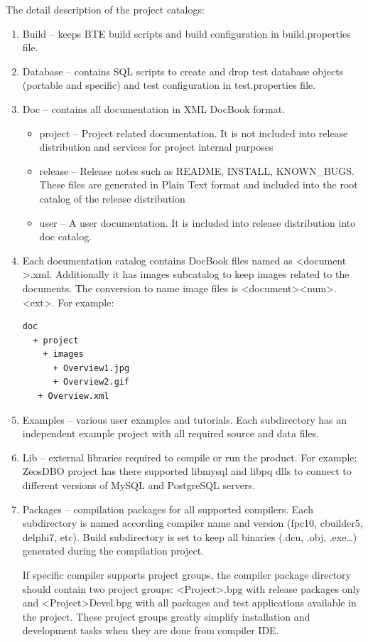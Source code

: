 \documentclass[a4paper,12pt,oneside]{book}
\begin{document}
The detail description of the project catalogs:
\begin{enumerate}
  \item Build – keeps BTE build scripts and build configuration in build.properties file.
	\item Database – contains SQL scripts to create and drop test database objects (portable and specific) and test configuration in test.properties file.
	\item Doc – contains all documentation in XML DocBook format.
	  \begin{itemize}
		  \item project – Project related documentation. It is not included into release distribution and services for project internal purposes
			\item release – Release notes such as README, INSTALL, KNOWN\_BUGS. These files are generated in Plain Text format and included into the root catalog of the release distribution
			\item user – A user documentation. It is included into release distribution into doc catalog.
		\end{itemize}
  \item
    Each documentation catalog contains DocBook files named as \textless document \textgreater .xml.
    Additionally it has images subcatalog to keep images related to the documents.
    The conversion to name image files is \textless document\textgreater\textless num\textgreater.\textless ext\textgreater. For example:
    \begin{verbatim}
doc
  + project
    + images
      + Overview1.jpg
      + Overview2.gif
   + Overview.xml
    \end{verbatim}		
  \item
	  Examples – various user examples and tutorials.
		Each subdirectory has an independent example project with all required source and data files.
	\item
	  Lib – external libraries required to compile or run the product.
		For example: ZeosDBO project has there supported libmysql and libpq dlls to connect to different versions of MySQL and PostgreSQL servers.
  \item
	  Packages – compilation packages for all supported compilers.
		Each subdirectory is named according compiler name and version (fpc10, cbuilder5, delphi7, etc).
		Build subdirectory is set to keep all binaries (.dcu, .obj, .exe…) generated during the compilation project. 
		
		If specific compiler supports project groups, the compiler package directory should contain two project groups: 
		\textless Project\textgreater.bpg with release packages only and \textless Project\textgreater Devel.bpg with all packages and test applications available in the project.
		These project groups greatly simplify installation and development tasks when they are done from compiler IDE.


\end{enumerate}
\end{document}
